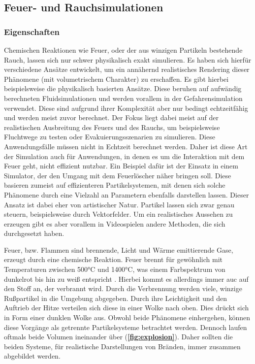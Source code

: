 \subsection{Feuer- und Rauchsimulationen}

\subsubsection{Eigenschaften}
Chemischen Reaktionen wie Feuer, oder der aus winzigen Partikeln bestehende Rauch,
lassen sich nur schwer physikalisch exakt simulieren. Es haben sich hierfür verschiedene Ansätze entwickelt, um ein
annähernd realistisches Rendering dieser Phänomene (mit volumetrischem Charakter) zu erschaffen. 
Es gibt hierbei beispielsweise die physikalisch basierten Ansätze. 
Diese beruhen auf aufwändig berechneten Fluidsimulationen und werden vorallem in der Gefahrensimulation verwendet.
Diese sind aufgrund ihrer Komplexität aber nur bedingt echtzeitfähig und werden meist zuvor berechnet. 
Der Fokus liegt dabei meist auf der realistischen Ausbreitung des Feuers und des Rauchs, um beispielsweise Fluchtwege 
zu testen oder Evakuierungsszenarien zu simulieren. Diese Anwendungsfälle müssen nicht in Echtzeit berechnet werden.
Daher ist diese Art der Simulation auch für Anwendungen, in denen es um die Interaktion mit dem Feuer geht, nicht 
effizient nutzbar. Ein Beispiel dafür ist der Einsatz in einem Simulator, der den Umgang mit dem Feuerlöscher
näher bringen soll. Diese basieren zumeist auf effizienteren Partikelsystemen, mit denen sich solche Phänomene 
durch eine Vielzahl an Parametern ebenfalls darstellen lassen. Dieser Ansatz ist dabei eher von artistischer Natur. 
Partikel lassen sich zwar genau steuern, beispielsweise durch Vektorfelder. Um ein realistisches Aussehen zu 
erzeugen gibt es aber vorallem in Videospielen andere Methoden, die sich durchgesetzt haben. 

Feuer, bzw. Flammen sind brennende, Licht und Wärme emittierende Gase, erzeugt durch eine chemische Reaktion. 
Feuer brennt für gewöhnlich mit Temperaturen zwischen 500°C und 1400°C, was einem Farbspektrum von dunkelrot bis hin zu weiß entspricht \parencite{Schmidt2011}.
Hierbei kommt es allerdings immer auc auf den Stoff an, der verbrannt wird.  
Durch die Verbrennung werden viele, winzige Rußpartikel in die Umgebung abgegeben. Durch ihre Leichtigkeit und den 
Auftrieb der Hitze verteilen sich diese in einer Wolke nach oben. Dies drückt sich in Form einer dunklen Wolke aus.
Obwohl beide Phänomene einhergehen, können diese Vorgänge als getrennte Partikelsysteme betrachtet werden.
Dennoch laufen oftmals beide Volumen ineinander über (\textbf{\autoref{fig:explosion}}).
Daher sollten die beiden Systeme, für realistische Darstellungen von Bränden, immer zusammen abgebildet werden.

